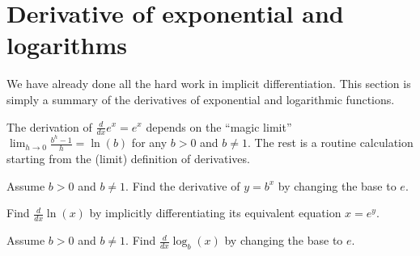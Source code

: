 \documentclass[../main.tex]{subfiles}
\begin{document}
 \section{Derivative of exponential and logarithms}
  We have already done all the hard work in implicit differentiation.  This section is simply a summary of the derivatives of exponential and logarithmic functions. 

  The derivation of \(\frac{d}{dx} e^{x} = e^{x}\) depends on the ``magic limit'' \(\lim_{h \to 0} \frac{b^{h} - 1}{h} = \ln(b)\) for any \(b > 0\) and \(b \ne 1\). The rest is a routine calculation starting from the (limit) definition of derivatives. 

  \begin{example}
    Assume \(b > 0\) and \(b \ne 1\). Find the derivative of \(y = b^{x}\) by changing the base to \(e\).

  \end{example}

  \begin{example}
    Find \(\frac{d}{dx}\ln(x)\) by implicitly differentiating its equivalent equation \(x = e^{y}\).

  \end{example}

  \begin{example}
    Assume \(b > 0\) and \(b \ne 1\). Find \(\frac{d}{dx} \log_{b}(x)\) by changing the base to \(e\).

  \end{example}
\end{document}
